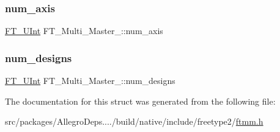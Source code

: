 \mbox{\label{struct_f_t___multi___master___a90a0ace4e40b91912259ad52fc86fb6f}} 
\subsubsection{\texorpdfstring{num\+\_\+axis}{num\_axis}}
{\footnotesize\ttfamily \hyperlink{fttypes_8h_abcb8db4dbf35d2b55a9e8c7b0926dc52}{F\+T\+\_\+\+U\+Int} F\+T\+\_\+\+Multi\+\_\+\+Master\+\_\+\+::num\+\_\+axis}

\mbox{\label{struct_f_t___multi___master___a78b797ee560f4b00795a7dce9656178d}} 
\subsubsection{\texorpdfstring{num\+\_\+designs}{num\_designs}}
{\footnotesize\ttfamily \hyperlink{fttypes_8h_abcb8db4dbf35d2b55a9e8c7b0926dc52}{F\+T\+\_\+\+U\+Int} F\+T\+\_\+\+Multi\+\_\+\+Master\+\_\+\+::num\+\_\+designs}



The documentation for this struct was generated from the following file\+:\begin{DoxyCompactItemize}
\item 
src/packages/\+Allegro\+Deps..../build/native/include/freetype2/\hyperlink{ftmm_8h}{ftmm.\+h}\end{DoxyCompactItemize}
